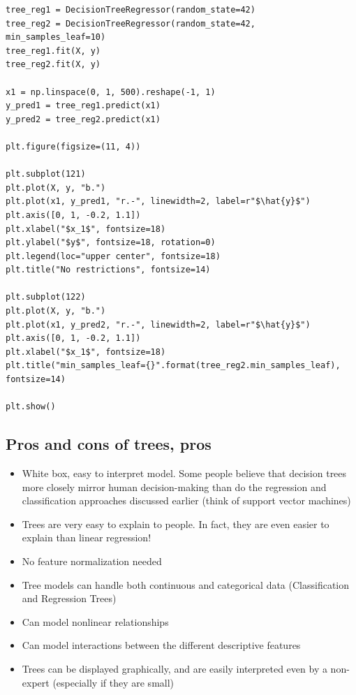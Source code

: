 \documentclass[%
oneside,                 %
final,                   %
10pt]{article}
\begin{document}
\begin{verbatim}
tree_reg1 = DecisionTreeRegressor(random_state=42)
tree_reg2 = DecisionTreeRegressor(random_state=42, min_samples_leaf=10)
tree_reg1.fit(X, y)
tree_reg2.fit(X, y)

x1 = np.linspace(0, 1, 500).reshape(-1, 1)
y_pred1 = tree_reg1.predict(x1)
y_pred2 = tree_reg2.predict(x1)

plt.figure(figsize=(11, 4))

plt.subplot(121)
plt.plot(X, y, "b.")
plt.plot(x1, y_pred1, "r.-", linewidth=2, label=r"$\hat{y}$")
plt.axis([0, 1, -0.2, 1.1])
plt.xlabel("$x_1$", fontsize=18)
plt.ylabel("$y$", fontsize=18, rotation=0)
plt.legend(loc="upper center", fontsize=18)
plt.title("No restrictions", fontsize=14)

plt.subplot(122)
plt.plot(X, y, "b.")
plt.plot(x1, y_pred2, "r.-", linewidth=2, label=r"$\hat{y}$")
plt.axis([0, 1, -0.2, 1.1])
plt.xlabel("$x_1$", fontsize=18)
plt.title("min_samples_leaf={}".format(tree_reg2.min_samples_leaf), fontsize=14)

plt.show()
\end{verbatim}



\subsection*{Pros and cons of trees, pros}

\begin{itemize}
\item White box, easy to interpret model. Some people believe that decision trees more closely mirror human decision-making than do the regression and classification approaches discussed earlier (think of support vector machines)

\item Trees are very easy to explain to people. In fact, they are even easier to explain than linear regression!

\item No feature normalization needed

\item Tree models can handle both continuous and categorical data (Classification and Regression Trees)

\item Can model nonlinear relationships

\item Can model interactions between the different descriptive features

\item Trees can be displayed graphically, and are easily interpreted even by a non-expert (especially if they are small)
\end{itemize}
\end{document}
